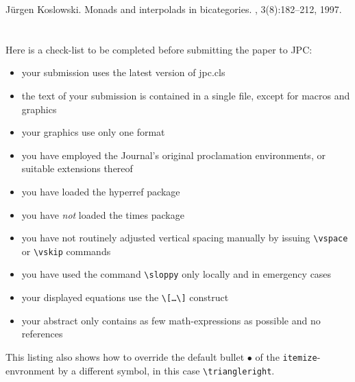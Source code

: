 \documentclass{CSLM} %
\theoremstyle{plain}\newtheorem{satz}[thm]{Satz} %
\begin{document}

\begin{thebibliography}{Kos97}

J{\"u}rgen Koslowski.
\newblock Monads and interpolads in bicategories.
, 3(8):182--212, 1997.

\end{thebibliography}

\appendix
\section{}
  Here is a check-list to be completed before submitting the paper to
  JPC:
\begin{itemize}[label=$\triangleright$]
\item your submission uses the latest version of jpc.cls
\item the text of your submission is contained in a single file,
  except for macros and graphics
\item your graphics use only one format 
\item you have employed the Journal's original proclamation environments,
  or suitable extensions thereof 
\item you have loaded the hyperref package
\item you have \emph{not} loaded the times package
\item you have not routinely adjusted vertical spacing manually by issuing
  \texttt{\textbackslash vspace} or \texttt{\textbackslash vskip} commands
\item you have used the command \texttt{\textbackslash sloppy} only
  locally and in emergency cases
\item your displayed equations use the
  \texttt{\textbackslash[\dots\textbackslash]} construct
\item your abstract only contains as few math-expressions as possible and no
  references 
\end{itemize}

  This listing also shows how to override the default bullet $\bullet$
  of the \texttt{itemize}-envronment by a different symbol, in this
  case \texttt{\textbackslash triangleright}.
\end{document}
